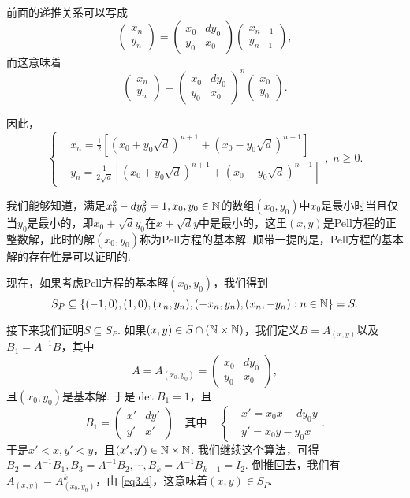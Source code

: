 前面的递推关系可以写成
\[
  \begin{pmatrix}
    x_n \\ y_n
  \end{pmatrix} =
  \begin{pmatrix}
    x_0 & dy_0 \\
    y_0 & x_0
  \end{pmatrix}
  \begin{pmatrix}
    x_{n-1} \\ y_{n-1}
  \end{pmatrix},
\]
而这意味着
\[
  \begin{pmatrix}
    x_n \\ y_n
  \end{pmatrix} =
  \begin{pmatrix}
    x_0 & dy_0 \\
    y_0 & x_0
  \end{pmatrix}^n
  \begin{pmatrix}
    x_0 \\ y_0
  \end{pmatrix}.
\]

因此，
\begin{equation}\label{eq3.4}
  \left\{
    \begin{aligned}
      & x_n = \frac12\left[
        \left( x_0 + y_0\sqrt d \right)^{n+1} +
        \left( x_0 - y_0\sqrt d \right)^{n+1}
      \right] \\
      & y_n = \frac1{2\sqrt d}\left[
        \left( x_0 + y_0\sqrt d \right)^{n+1} +
        \left( x_0 - y_0\sqrt d \right)^{n+1}
      \right]
    \end{aligned}
  \right.,\; n\ge 0.
\end{equation}


我们能够知道，满足$x_0^2-dy_0^2=1,x_0,y_0\in\mathbb N$的数组$(x_0,y_0)$中$x_0$是最小时当且仅当$y_0$是最小的，即$x_0+\sqrt dy_0$在$x+\sqrt dy$中是最小的，这里$(x,y)$是Pell方程的正整数解，此时的解$(x_0,y_0)$称为Pell方程的{\kaishu 基本解}. 顺带一提的是，Pell方程的基本解的存在性是可以证明的.

现在，如果考虑Pell方程的基本解$(x_0,y_0)$，我们得到
\[
  S_P\subseteq\{(-1,0),(1,0),(x_n,y_n),(-x_n,y_n),
  (x_n,-y_n):n\in\mathbb N\} = S.
\]

接下来我们证明$S\subseteq S_P$. 如果$(x,y)\in S\cap (\mathbb N\times\mathbb N)$，我们定义$B=A_{(x,y)}$以及$B_1=A^{-1}B$，其中
\[
  A = A_{(x_0,y_0)} = \begin{pmatrix}
    x_0 & dy_0 \\
    y_0 & x_0
  \end{pmatrix},
\]
且$(x_0,y_0)$是基本解. 于是$\det B_1=1$，且
\[
  B_1 = \begin{pmatrix}
    x' & dy' \\
    y' & x'
  \end{pmatrix}\quad \text{其中}\quad
  \left\{
    \begin{aligned}
      & x' = x_0x - dy_0y \\
      & y' = x_0y - y_0x
    \end{aligned}
  \right.  .
\]
于是$x'<x,y'<y$，且$(x',y')\in\mathbb N\times\mathbb N$. 我们继续这个算法，可得$B_2=A^{-1}B_1,B_3=A^{-1}B_2,\cdots,B_k=A^{-1}B_{k-1}=I_2$. 倒推回去，我们有$A_{(x,y)}=A_{(x_0,y_0)}^k$，由 \eqref{eq3.4}，这意味着$(x,y)\in S_P$.

